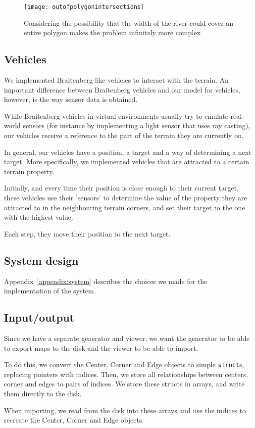 \begin{figure}
	\centering
	\texttt{[image: outofpolygonintersections]}
	\caption{Considering the possibility that the width of the river could cover an entire polygon makes the problem infinitely more complex}
	\label{riverproblem3}
\end{figure}

\subsection{Vehicles}

We implemented Braitenberg-like vehicles to interact with the terrain.
An important difference between Braitenberg vehicles and our model for vehicles, however, is the way sensor data is obtained.

While Braitenberg vehicles in virtual environments usually try to emulate real-world sensors (for instance by implementing a light sensor that uses ray casting), our vehicles receive a reference to the part of the terrain they are currently on.

In general, our vehicles have a position, a target and a way of determining a next target.
More specifically, we implemented vehicles that are attracted to a certain terrain property.

Initially, and every time their position is close enough to their current target,
these vehicles use their 'sensors' to determine the value of the property they are attracted to in the neighbouring terrain corners, and set their target to the one with the highest value.

Each step, they move their position to the next target.

\subsection{System design}

Appendix~\ref{appendix:system} describes the choices we made for the implementation of the system.

\subsection{Input/output}

Since we have a separate generator and viewer, we want the generator to be able to export maps to the disk and the viewer to be able to import.

To do this, we convert the Center, Corner and Edge objects to simple \texttt{struct}s, replacing pointers with indices.
Then, we store all relationships between centers, corner and edges to pairs of indices.
We store these structs in arrays, and write them directly to the disk.

When importing, we read from the disk into these arrays and use the indices to recreate the Center, Corner and Edge objects.
